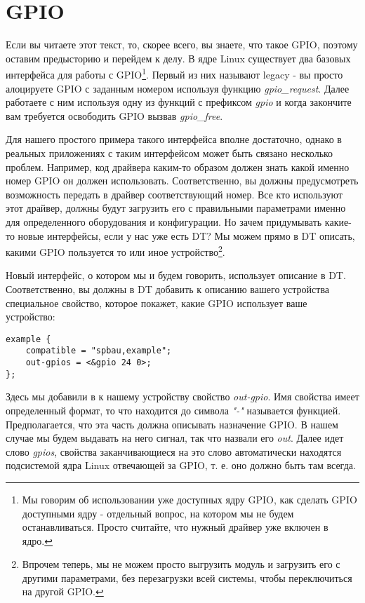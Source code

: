 \section{GPIO}

Если вы читаете этот текст, то, скорее всего, вы знаете, что такое GPIO, поэтому
оставим предысторию и перейдем к делу. В ядре Linux существует два базовых
интерфейса для работы с GPIO\footnote{Мы говорим об использовании уже доступных
ядру GPIO, как сделать GPIO доступными ядру - отдельный вопрос, на котором мы
не будем останавливаться. Просто считайте, что нужный драйвер уже включен в
ядро.}. Первый из них называют legacy - вы просто алоцируете GPIO с заданным
номером используя функцию \emph{gpio\_request}. Далее работаете с ним используя
одну из функций с префиксом \emph{gpio} и когда закончите вам требуется
освободить GPIO вызвав \emph{gpio\_free}.

Для нашего простого примера такого интерфейса вполне достаточно, однако в
реальных приложениях с таким интерфейсом может быть связано несколько проблем.
Например, код драйвера каким-то образом должен знать какой именно номер GPIO
он должен использовать. Соответственно, вы должны предусмотреть возможность
передать в драйвер соответствующий номер. Все кто используют этот драйвер,
должны будут загрузить его с правильными параметрами именно для определенного
оборудования и конфигурации. Но зачем придумывать какие-то новые интерфейсы,
если у нас уже есть DT? Мы можем прямо в DT описать, какими GPIO пользуется то
или иное устройство\footnote{Впрочем теперь, мы не можем просто выгрузить модуль
и загрузить его с другими параметрами, без перезагрузки всей системы, чтобы
переключиться на другой GPIO.}.

Новый интерфейс, о котором мы и будем говорить, использует описание в DT.
Соответственно, вы должны в DT добавить к описанию вашего устройства специальное
свойство, которое покажет, какие GPIO использует ваше устройство:
\begin{lstlisting}
example {
	compatible = "spbau,example";
	out-gpios = <&gpio 24 0>;
};
\end{lstlisting}

Здесь мы добавили в к нашему устройству свойство \emph{out-gpio}. Имя свойства
имеет определенный формат, то что находится до символа \emph{"-"} называется
функцией. Предполагается, что эта часть должна описывать назначение GPIO. В
нашем случае мы будем выдавать на него сигнал, так что назвали его \emph{out}.
Далее идет слово \emph{gpios}, свойства заканчивающиеся на это слово
автоматически находятся подсистемой ядра Linux отвечающей за GPIO, т. е. оно
должно быть там всегда.

